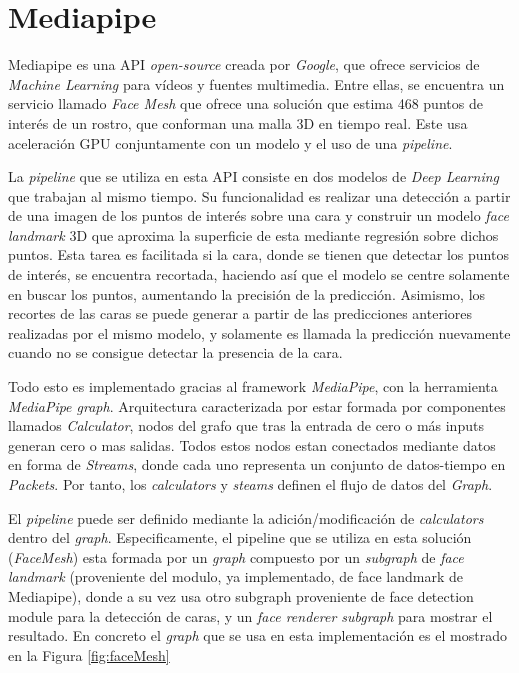 \newpage
\section{Mediapipe}

Mediapipe es una API \textit{open-source} creada por \textit{Google}, que ofrece servicios de \textit{Machine Learning} para vídeos y fuentes multimedia. Entre ellas, se encuentra un servicio llamado \textit{Face Mesh} que ofrece una solución que estima 468 puntos de interés de un rostro, que conforman una malla 3D en tiempo real. Este usa aceleración GPU conjuntamente con un modelo y el uso de una \textit{pipeline}.

La \textit{pipeline} que se utiliza en esta API consiste en dos modelos de \textit{Deep Learning} que trabajan al mismo tiempo. Su funcionalidad es realizar una detección a partir de una imagen de los puntos de interés sobre una cara y construir un modelo \textit{face landmark} 3D que aproxima la superficie de esta mediante regresión sobre dichos puntos. Esta tarea es facilitada si la cara, donde se tienen que detectar los puntos de interés, se encuentra recortada, haciendo así que el modelo se centre solamente en buscar los puntos, aumentando la precisión de la predicción. Asimismo, los recortes de las caras se puede generar a partir de las predicciones anteriores realizadas por el mismo modelo, y solamente es llamada la predicción nuevamente cuando no se consigue detectar la presencia de la cara.\cite{faceMesh}

Todo esto es implementado gracias al framework \textit{MediaPipe}, con la herramienta \textit{MediaPipe graph}. Arquitectura caracterizada por estar formada por componentes llamados \textit{Calculator}, nodos del grafo que tras la entrada de cero o más inputs generan cero o mas salidas. Todos estos nodos estan conectados mediante datos en forma de \textit{Streams}, donde cada uno representa un conjunto de datos-tiempo en \textit{Packets}. Por tanto, los \textit{calculators} y \textit{steams} definen el flujo de datos del \textit{Graph}. \cite{mediapipe}

El \textit{pipeline} puede ser definido mediante la adición/modificación de \textit{calculators} dentro del \textit{graph}. Especificamente, el pipeline que se utiliza en esta solución (\textit{FaceMesh}) esta formada por un \textit{graph} compuesto por un \textit{subgraph} de \textit{face landmark} (proveniente del modulo, ya implementado, de face landmark de Mediapipe), donde a su vez usa otro subgraph proveniente de face detection module para la detección de caras, y un \textit{face renderer subgraph} para mostrar el resultado. \cite{faceMesh} En concreto el \textit{graph} que se usa en esta implementación es el mostrado en la Figura \ref{fig:faceMesh}

